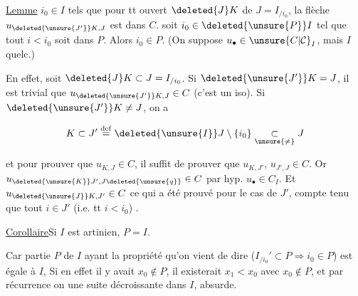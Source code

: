 
\uline{Lemme}   $i_0\in I$ tels que pour tt ouvert $\deleted{J}K$ de $J=I_{/i_0}$, la flèche $u_{\deleted{\unsure{J'}}K,J}$ est dans $C$.   soit $i_0\in\deleted{\unsure{P}}I$ tel que tout $i<i_0$ soit dans $P$. Alors $i_0\in P$. (On suppose $u_\bullet\in \unsure{C|\mathcal C}_I$, mais $I$ quelc.)

En effet,  soit $\deleted{J}K\subset J=I_{/i_0}$. Si  $\deleted{\unsure{J'}}K=J$, il est trivial que $u_{\deleted{\unsure{J'}}K,J}\in C$ (c'est un iso). Si $\deleted{\unsure{J'}}K\ne J$, on a 

\[
 K\subset J'\overset{\mathrm{def}}{=}\deleted{\unsure{I}}J\setminus\{i_0\}\underset{\unsure{\ne}}{\subset}J
\]

et pour prouver que $u_{K,J}\in C$, il suffit de prouver que $u_{K,J'}$, $u_{J',J}\in C$. Or $u_{\deleted{\unsure{K}}J',J\deleted{\unsure{q}}}\in C$ par hyp. $u_\bullet\in C_I$. Et $u_{\deleted{\unsure{J}}K,J'}\in C$  ce qui a été prouvé pour le cas de $J'$, compte tenu que  tout $i\in J'$ (i.e. tt $i<i_0$)  .

 \uline{Corollaire}\qquad Si $I$ est artinien, $P=I$.

Car  partie $P$ de $I$ ayant la propriété qu'on vient de dire ($I_{/i_0}'\subset P\Longrightarrow i_0\in P$) est égale à $I$,  Si en effet il y avait $x_0\notin P$, il existerait $x_1<x_0$ avec $x_0\notin P$, et par récurrence on  une suite  décroissante dans $I$, absurde.


